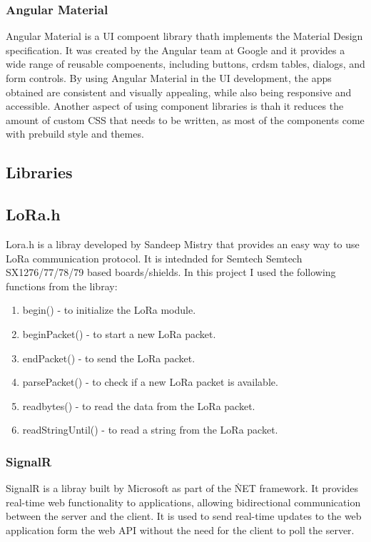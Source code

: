 \subsubsection{Angular Material}
Angular Material is a UI compoent library thath implements the Material Design specification.
It was created by the Angular team at Google and it provides a wide range of reusable compoenents, including 
buttons, crdsm tables, dialogs, and form controls. By using Angular Material in the UI development, the apps obtained are consistent
and visually appealing, while also being responsive and accessible. Another aspect of using component libraries is thah 
it reduces the amount of custom CSS that needs to be written, as most of the components come with prebuild style and themes\cite{material_design_spec}\cite{angular_material_docs}.


\subsection{Libraries}
\subsection{LoRa.h}
Lora.h is a libray developed by Sandeep Mistry that provides an easy way to use LoRa communication protocol. 
It is intednded for Semtech Semtech SX1276/77/78/79 based boards/shields\cite{arduino_lora_lib}.
In this project I used the following functions from the libray: 
\begin{enumerate}
    \item begin() - to initialize the LoRa module.
    \item beginPacket() - to start a new LoRa packet.
    \item endPacket() - to send the LoRa packet.
    \item parsePacket() - to check if a new LoRa packet is available.
    \item readbytes() - to read the data from the LoRa packet.
    \item readStringUntil() - to read a string from the LoRa packet.
\end{enumerate}

\subsubsection{SignalR}
SignalR is a libray built by Microsoft as part of the \.NET framework. It provides real-time web functionality to applications, allowing bidirectional
communication between the server and the client. It is used to send real-time updates to the web application form the web API 
without the need for the client to poll the server\cite{signalr_docs}.

